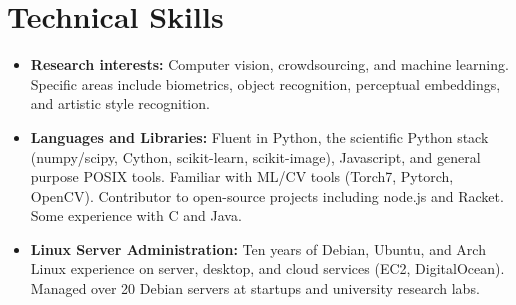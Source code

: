 \documentclass[10pt,letterpaper]{article}
\begin{document}
\section*{Technical Skills}
\vspace{-4pt}
\begin{itemize}
\item \textbf{Research interests:} Computer vision, crowdsourcing, and machine learning. Specific areas include biometrics, object recognition, perceptual embeddings, and artistic style recognition.

\item \textbf{Languages and Libraries:}
  Fluent in Python, the scientific Python stack (numpy/scipy,
  Cython, scikit-learn, scikit-image), Javascript, and
  general purpose POSIX tools. %
  Familiar with ML/CV tools (Torch7, Pytorch, OpenCV).
  Contributor to open-source projects including node.js and Racket. Some experience with C and Java.
\item \textbf{Linux Server Administration:}
  Ten years of Debian, Ubuntu, and Arch Linux experience on server,
  desktop, and cloud services (EC2, Digital\-Ocean). Managed over 20
  Debian servers at
  startups and university research labs.
\end{itemize}
\vspace{-8pt}
\end{document}
